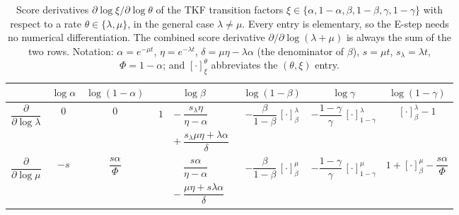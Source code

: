 \documentclass{article}
\newcommand{\ins}{\lambda}
\newcommand{\del}{\mu}
\begin{document}
  \begin{table}[t]
	\caption{Score derivatives $\partial\log\xi/\partial\log\theta$ of the TKF transition
		factors $\xi\in\{\alpha,1{-}\alpha,\beta,1{-}\beta,\gamma,1{-}\gamma\}$ with respect to
		a rate $\theta\in\{\ins,\del\}$, in the general case $\ins\neq\del$. Every entry is
		elementary, so the E-step needs no numerical differentiation. The combined score
		derivative $\partial/\partial\log(\ins{+}\del)$ is always the sum of the two rows.
		Notation: $\alpha{=}e^{-\del t}$, $\eta{=}e^{-\ins t}$,
		$\delta{=}\del\eta-\ins\alpha$ (the denominator of $\beta$), $s{=}\del t$,
		$s_\ins{=}\ins t$, $\Phi{=}1{-}\alpha$; and $[\cdot]^{\theta}_{\xi}$ abbreviates the
		$(\theta,\xi)$ entry.}
	\label{tab:score-derivatives}
	\centering
	\setlength{\tabcolsep}{4pt}
	\begin{tabular}{ccccccc}
		\toprule
		& $\log\alpha$ & $\log(1{-}\alpha)$ & $\log\beta$
		& $\log(1{-}\beta)$ & $\log\gamma$ & $\log(1{-}\gamma)$ \\
		\midrule
		$\dfrac{\partial}{\partial\log\ins}$
		& $0$ & $0$
		& $\begin{aligned} 1 &{}-\dfrac{s_\ins\eta}{\eta-\alpha}\\[2pt]
			&{}+\dfrac{s_\ins\del\eta+\ins\alpha}{\delta}\end{aligned}$
		& $-\dfrac{\beta}{1-\beta}\,[\cdot]^{\ins}_{\beta}$
		& $-\dfrac{1-\gamma}{\gamma}\,[\cdot]^{\ins}_{1-\gamma}$
		& $[\cdot]^{\ins}_{\beta}-1$ \\[10pt]
		$\dfrac{\partial}{\partial\log\del}$
		& $-s$ & $\dfrac{s\alpha}{\Phi}$
		& $\begin{aligned} &\phantom{{}-{}}\dfrac{s\alpha}{\eta-\alpha}\\[2pt]
			&{}-\dfrac{\del\eta+s\ins\alpha}{\delta}\end{aligned}$
		& $-\dfrac{\beta}{1-\beta}\,[\cdot]^{\del}_{\beta}$
		& $-\dfrac{1-\gamma}{\gamma}\,[\cdot]^{\del}_{1-\gamma}$
		& $1+[\cdot]^{\del}_{\beta}-\dfrac{s\alpha}{\Phi}$ \\
		\bottomrule
	\end{tabular}
\end{table}
\end{document}

